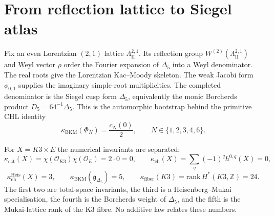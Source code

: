 
\providecommand{\ZZ}{\mathbb{Z}}
\providecommand{\RR}{\mathbb{R}}
\providecommand{\CC}{\mathbb{C}}
\providecommand{\QQ}{\mathbb{Q}}
\providecommand{\NN}{\mathbb{N}}
\providecommand{\Delaf}{\Delta_5}
\providecommand{\LamII}{\Lambda^{2,1}_{\mathrm{II}}}
\providecommand{\LamI}{\Lambda^{2,1}_{\mathrm{I}}}
\providecommand{\Lamtwoone}{\Lambda^{2,1}}
\providecommand{\gbkm}{\mathfrak{g}_{\Delaf}}
\providecommand{\gbkmL}{\mathfrak{g}_L}
\providecommand{\gbkmLh}{\mathfrak{g}^{(g_N,h_M)}_L}
\providecommand{\mult}{\operatorname{mult}}
\providecommand{\kBKM}{\kappa_{\mathrm{BKM}}}
\providecommand{\kch}{\kappa_{\mathrm{ch}}}
\providecommand{\kcat}{\kappa_{\mathrm{cat}}}
\providecommand{\kfib}{\kappa_{\mathrm{fiber}}}
\providecommand{\Sp}{\mathrm{Sp}}
\providecommand{\Phihol}{\Phi^{\mathrm{FA}}}
\providecommand{\PII}{\mathcal{P}_{\mathrm{II}}}
\providecommand{\PIprim}{\mathcal{P}_{\mathrm{I},\mathrm{prim}}}
\providecommand{\PIIprim}{\mathcal{P}_{\mathrm{II},\mathrm{prim}}}
\providecommand{\Wtwo}{W^{(2)}}

\section{From reflection lattice to Siegel atlas}
\label{sec:delta5-reflection-siegel-atlas}

Fix an even Lorentzian $(2,1)$ lattice $\LamII$. Its reflection group
$\Wtwo(\LamII)$ and Weyl vector $\rho$ order the Fourier expansion of
$\Delaf$ into a Weyl denominator. The real roots give the Lorentzian
Kac--Moody skeleton. The weak Jacobi form $\phi_{0,1}$ supplies the
imaginary simple-root multiplicities. The completed denominator is the
Siegel cusp form $\Delaf$, equivalently the monic Borcherds product
$D_5=64^{-1}\Delaf$. This is the automorphic bootstrap behind the
primitive CHL identity
\[
  \kBKM(\Phi_N)=\frac{c_N(0)}{2},
  \qquad N\in\{1,2,3,4,6\}.
\]

For $X=K3\times E$ the numerical invariants are separated:
\[
  \kcat(X)=\chi(\mathcal O_{K3})\chi(\mathcal O_E)=2\cdot0=0,
  \qquad
  \kch(X)=\sum_q(-1)^qh^{0,q}(X)=0,
\]
\[
  \kappa_{\mathrm{ch}}^{\mathrm{Heis}}(X)=3,\qquad
  \kBKM(\gbkm)=5,\qquad
  \kfib(K3)=\mathrm{rank}\,H^\ast(K3,\ZZ)=24.
\]
The first two are total-space invariants, the third is a
Heisenberg--Mukai specialisation, the fourth is the Borcherds weight of
$\Delaf$, and the fifth is the Mukai-lattice rank of the K3 fibre. No
additive law relates these numbers.

